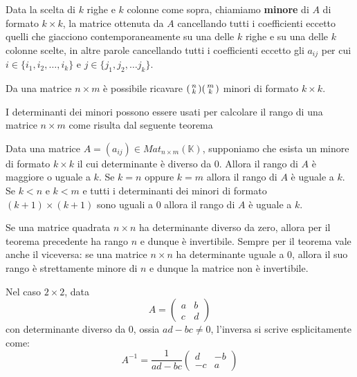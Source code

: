 \begin{definition}
	Data la scelta di $k$ righe e $k$ colonne come sopra, chiamiamo
	\textbf{minore} di $A$ di formato $k \times k$, la matrice ottenuta da $A$
	cancellando tutti i coefficienti eccetto quelli che giacciono
	contemporaneamente su una delle $k$ righe e su una delle $k$ colonne scelte,
	in altre parole cancellando tutti i coefficienti eccetto gli $a_{ij}$ per
	cui $i \in \{i_1, i_2, \dots, i_k\}$ e $j \in \{j_1, j_2, \dots j_k\}$.
\end{definition}

\begin{observation}
	Da una matrice $n \times m$ \`e possibile ricavare $\begin{psmallmatrix}
			n \\ k \end{psmallmatrix} \begin{psmallmatrix}
			m \\ k \end{psmallmatrix}$ minori di formato $k \times k$.
\end{observation}

I determinanti dei minori possono essere usati per calcolare il rango di una
matrice $n \times m$ come risulta dal seguente teorema

\begin{theorem}
	Data una matrice $A = (a_{ij}) \in Mat_{n \times m}(\mathbb{K})$, supponiamo
	che esista un minore di formato $k \times k$ il cui determinante \`e diverso
	da 0. Allora il rango di $A$ \`e maggiore o uguale a $k$. Se $k = n$ oppure
	$k = m$ allora il rango di $A$ \`e uguale a $k$. Se $k < n$ e $k < m$ e tutti
	i determinanti dei minori di formato $(k + 1) \times (k + 1)$ sono uguali a 0
	allora il rango di $A$ \`e uguale a $k$.
\end{theorem}

\begin{observation}
	Se una matrice quadrata $n \times n$ ha determinante diverso da zero, allora
	per il teorema precedente ha rango $n$ e dunque \`e invertibile. Sempre per il
	teorema vale anche il viceversa: se una matrice $n \times n$ ha determinante
	uguale a 0, allora il suo rango \`e strettamente minore di $n$ e dunque la
	matrice non \`e invertibile.

	Nel caso $2 \times 2$, data
	\begin{equation*}
		A = \begin{pmatrix}
			a & b \\
			c & d
		\end{pmatrix}
	\end{equation*}
	con determinante diverso da 0, ossia $ad - bc \neq 0$, l'inversa si scrive
	esplicitamente come:
	\begin{equation*}
		A^{-1} = \frac{1}{ad - bc} \begin{pmatrix}
			d  & -b \\
			-c & a
		\end{pmatrix}
	\end{equation*}
\end{observation}


